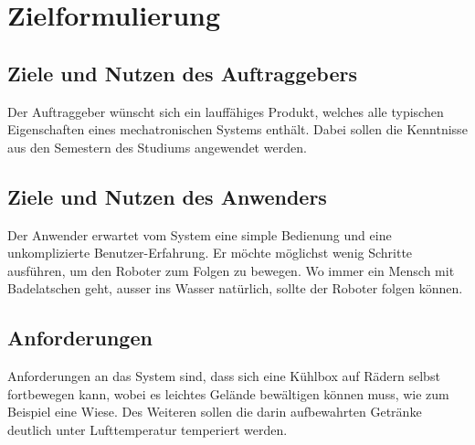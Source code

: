 \section{Zielformulierung}

\subsection{Ziele und Nutzen des Auftraggebers}
Der Auftraggeber wünscht sich ein lauffähiges Produkt, welches alle typischen Eigenschaften eines mechatronischen Systems enthält. Dabei sollen die Kenntnisse aus den Semestern des Studiums angewendet werden.

\subsection{Ziele und Nutzen des Anwenders}
Der Anwender erwartet vom System eine simple Bedienung und eine unkomplizierte Benutzer-Erfahrung. Er möchte möglichst wenig Schritte ausführen, um den Roboter zum Folgen zu bewegen. Wo immer ein Mensch mit Badelatschen geht, ausser ins Wasser natürlich, sollte der Roboter folgen können.

\subsection{Anforderungen}
Anforderungen an das System sind, dass sich eine Kühlbox auf Rädern selbst fortbewegen kann, wobei es leichtes Gelände bewältigen können muss, wie zum Beispiel eine Wiese. Des Weiteren sollen die darin aufbewahrten Getränke deutlich unter Lufttemperatur temperiert werden.

